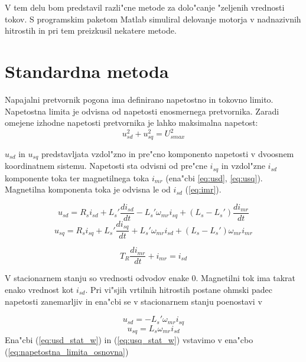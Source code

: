 \documentclass[journal,a4paper,twoside]{sty/IEEEtran}
\begin{document}
V tem delu bom predstavil razli"cne metode za dolo"canje "zeljenih vrednosti tokov.
S programskim paketom Matlab simuliral delovanje motorja v nadnazivnih hitrostih in pri tem preizkusil nekatere metode.

\section{Standardna metoda}
Napajalni pretvornik pogona ima definirano napetostno in tokovno limito. Napetostna limita je odvisna od napetosti enosmernega pretvornika.\cite{vas}
Zaradi omejene izhodne napetosti pretvornika je lahko maksimalna napetost:
\begin{equation}
u_{sd}^2+u_{sq}^2= U_{smax}^2
\label{eq:napetostna_limita_osnovna}
\end{equation}

$u_{sd}$ in $u_{sq}$ predstavljata vzdol"zno in pre"cno komponento  napetosti v dvoosnem koordinatnem sistemu. Napetosti sta odvisni od pre"cne $i_{sq}$ in vzdol"zne $i_{sd}$ komponente toka ter magnetilnega  toka $i_{mr}$ (ena"cbi \ref{eq:usd}, \ref{eq:usq}). Magnetilna komponenta toka je odvisna le od $i_{sd}$ (\ref{eq:imr}).\cite{servopogoni}

\begin{equation}
u_{sd}= R_s i_{sd}+L_s' \frac{di_{sd}}{dt}- L_s' \omega_{mr} i_{sq}+(L_s-L_s')\frac{di_{mr}}{dt}
\label{eq:usd}
\end{equation}
\begin{equation}
u_{sq}= R_s i_{sq}+L_s' \frac{di_{sq}}{dt} + L_s' \omega_{mr}i_{sd}+(L_s-L_s')\omega_{mr}i_{mr}
\label{eq:usq}
\end{equation}

\begin{equation}
T_R\frac{di_{mr}}{dt}+i_{mr} =i_{sd}
\label{eq:imr}
\end{equation}


V stacionarnem stanju so vrednosti odvodov enake 0. Magnetilni tok ima takrat enako vrednost kot $i_{sd}$. Pri vi"sjih vrtilnih hitrostih postane ohmski padec napetosti zanemarljiv in ena"cbi se v stacionarnem stanju poenostavi v

\begin{equation}
u_{sd}= - L_s' \omega_{mr} i_{sq}
\label{eq:usd_stat_w}
\end{equation}
\begin{equation}
u_{sq}=  L_s \omega_{mr}i_{sd}
\label{eq:usq_stat_w}
\end{equation}
 Ena"cbi (\ref{eq:usd_stat_w}) in (\ref{eq:usq_stat_w}) vstavimo v ena"cbo (\ref{eq:napetostna_limita_osnovna})
\end{document}
